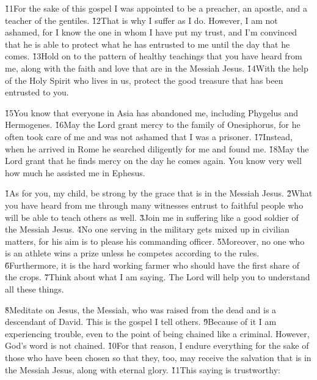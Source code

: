 \v{11}For the sake of this gospel I was appointed to be a preacher, an apostle, and a teacher of the gentiles. \v{12}That is why I suffer as I do. However, I am not ashamed, for I know the one in whom I have put my trust, and I'm convinced that he is able to protect what he has entrusted to me until the day that he comes. \v{13}Hold on to the pattern of healthy teachings that you have heard from me, along with the faith and love that are in the Messiah Jesus. \v{14}With the help of the Holy Spirit who lives in us, protect the good treasure that has been entrusted to you.

\v{15}You know that everyone in Asia has abandoned me, including Phygelus and Hermogenes. \v{16}May the Lord grant mercy to the family of Onesiphorus, for he often took care of me and was not ashamed that I was a prisoner. \v{17}Instead, when he arrived in Rome he searched diligently for me and found me. \v{18}May the Lord grant that he finds mercy on the day he comes again. You know very well how much he assisted me in Ephesus.

\v{1}As for you, my child, be strong by the grace that is in the Messiah Jesus. \v{2}What you have heard from me through many witnesses entrust to faithful people who will be able to teach others as well. \v{3}Join me in suffering like a good soldier of the Messiah Jesus. \v{4}No one serving in the military gets mixed up in civilian matters, for his aim is to please his commanding officer. \v{5}Moreover, no one who is an athlete wins a prize unless he competes according to the rules. \v{6}Furthermore, it is the hard working farmer who should have the first share of the crops. \v{7}Think about what I am saying. The Lord will help you to understand all these things.

\v{8}Meditate on Jesus, the Messiah, who was raised from the dead and is a descendant of David. This is the gospel I tell others. \v{9}Because of it I am experiencing trouble, even to the point of being chained like a criminal. However, God's word is not chained. \v{10}For that reason, I endure everything for the sake of those who have been chosen so that they, too, may receive the salvation that is in the Messiah Jesus, along with eternal glory. \v{11}This saying is trustworthy:

